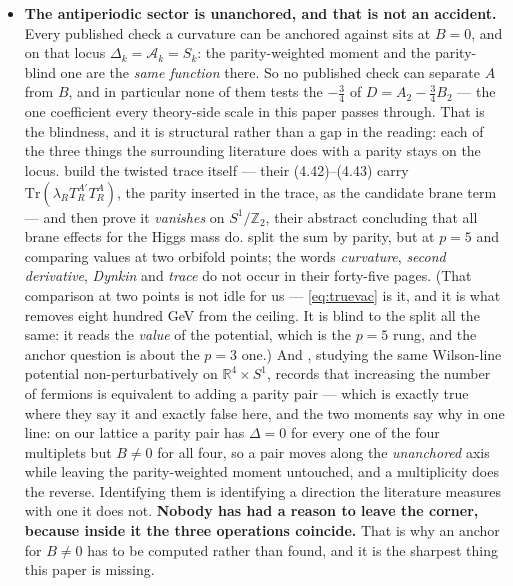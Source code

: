 \documentclass[11pt,a4paper]{article}
\newcommand{\ZZ}{\mathbb{Z}}
\begin{document}
\begin{itemize}
not have. Until then the strongest statement in \S\ref{sec:collider} --- \eqref{eq:combchi}, which
reads the comb and therefore the seed, and not \eqref{eq:tulimit}, which does not --- has one
determination and no
second opinion.
\item \textbf{The antiperiodic sector is unanchored, and that is not an accident.} Every published
check a curvature can be anchored against sits at $B=0$, and on that locus $\Delta_k=\mathcal{A}_k=S_k$: the parity-weighted moment and
the parity-blind one are the \emph{same function} there. So no published check can separate $A$
from $B$, and in particular none of them tests the $-\tfrac34$ of $D=A_2-\tfrac34B_2$ --- the one
coefficient every theory-side scale in this paper passes through. That is the blindness, and it is
structural rather than a gap in the reading: each of the three things the surrounding
literature does with a parity stays on the locus. \cite{vGIQ} build the
twisted trace itself --- their (4.42)--(4.43) carry $\mathrm{Tr}(\lambda_R T^{A'}_R T^A_R)$, the parity
inserted in the trace, as the candidate brane term --- and then prove it \emph{vanishes} on
$S^1/\ZZ_2$, their abstract concluding that all brane effects for the Higgs mass do. \cite{CCD24}
split the sum by parity, but at $p=5$ and comparing values at two orbifold points; the words
\emph{curvature}, \emph{second derivative}, \emph{Dynkin} and \emph{trace} do not occur in their
forty-five pages. (That comparison at two points is not idle for us --- \eqref{eq:truevac} is it,
and it is what removes eight hundred GeV from the ceiling. It is blind to the split all the same:
it reads the \emph{value} of the potential, which is the $p=5$ rung, and the anchor question is
about the $p=3$ one.) And \cite{PGY24}, studying the same Wilson-line potential non-perturbatively on
$\mathbb{R}^4\times S^1$, records that increasing the number of fermions is equivalent to adding a parity
pair --- which is exactly true where they say it and exactly false here, and the two moments say
why in one line: on our lattice a parity pair has $\Delta=0$ for every one of the four multiplets
but $B\neq0$ for all four, so a pair moves along the \emph{unanchored} axis while leaving the
parity-weighted moment untouched, and a multiplicity does the reverse. Identifying them is
identifying a direction the literature measures with one it does not.
\textbf{Nobody has had a reason to leave the corner, because
inside it the three operations coincide.} That is why an anchor for $B\neq0$ has to be
computed rather than found, and it is the sharpest thing this paper is missing.


\end{itemize}
\end{document}
